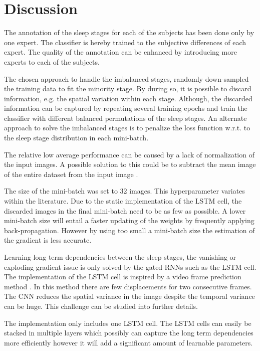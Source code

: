 \section{Discussion}
\label{sec:discussion}
The annotation of the sleep stages for each of the subjects has been done only by one expert. The classifier is hereby trained to the subjective differences of each expert. The quality of the annotation can be enhanced by introducing more experts to each of the subjects.

The chosen approach to handle the imbalanced stages, randomly down-sampled the training data to fit the minority stage.
By during so, it is possible to discard information, e.g. the spatial variation within each stage. 
Although, the discarded information can be captured by repeating several training epochs and train the classifier with different balanced permutations of the sleep stages.
An alternate approach to solve the imbalanced stages is to penalize the loss function w.r.t. to the sleep stage distribution in each mini-batch.

The relative low average performance can be caused by a lack of normalization of the input images. A possible solution to this could be to subtract the mean image of the entire dataset from the input image \cite{	main_ar,VGGnet16}.

The size of the mini-batch was set to 32 images. This hyperparameter variates within the literature. Due to the static implementation of the LSTM cell, the discarded images in the final mini-batch need to be as few as possible. A lower mini-batch size will entail a faster updating of the weights by frequently applying back-propagation. However by using too small a mini-batch size the estimation of the gradient is less accurate.

Learning long term dependencies between the sleep stages, the vanishing or exploding gradient issue is only solved by the gated RNNs such as the LSTM cell. The implementation of the LSTM cell is inspired by a video frame prediction method \cite{git_lstm}. In this method there are few displacements for two consecutive frames. The CNN reduces the spatial variance in the image despite the temporal variance can be huge. This challenge can be studied into further details.

The implementation only includes one LSTM cell. The LSTM cells can easily be stacked in multiple layers which possibly can capture the long term dependencies more efficiently however it will add a significant amount of learnable parameters.

